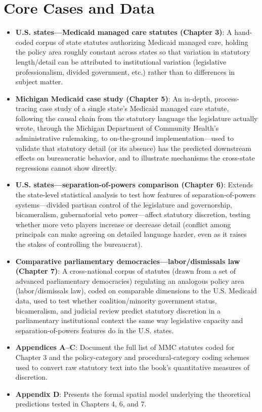 \documentclass[12pt]{article}
\begin{document}
\section{Core Cases and Data}

\begin{itemize}[leftmargin=*, itemsep=4pt]
    \item \textbf{U.S. states---Medicaid managed care statutes (Chapter 3)}: A hand-coded corpus of state statutes authorizing Medicaid managed care, holding the policy area roughly constant across states so that variation in statutory length/detail can be attributed to institutional variation (legislative professionalism, divided government, etc.) rather than to differences in subject matter.
    \item \textbf{Michigan Medicaid case study (Chapter 5)}: An in-depth, process-tracing case study of a single state's Medicaid managed care statute, following the causal chain from the statutory language the legislature actually wrote, through the Michigan Department of Community Health's administrative rulemaking, to on-the-ground implementation---used to validate that statutory detail (or its absence) has the predicted downstream effects on bureaucratic behavior, and to illustrate mechanisms the cross-state regressions cannot show directly.
    \item \textbf{U.S. states---separation-of-powers comparison (Chapter 6)}: Extends the state-level statistical analysis to test how features of separation-of-powers systems---divided partisan control of the legislature and governorship, bicameralism, gubernatorial veto power---affect statutory discretion, testing whether more veto players increase or decrease detail (conflict among principals can make agreeing on detailed language harder, even as it raises the stakes of controlling the bureaucrat).
    \item \textbf{Comparative parliamentary democracies---labor/dismissals law (Chapter 7)}: A cross-national corpus of statutes (drawn from a set of advanced parliamentary democracies) regulating an analogous policy area (labor/dismissals law), coded on comparable dimensions to the U.S. Medicaid data, used to test whether coalition/minority government status, bicameralism, and judicial review predict statutory discretion in a parliamentary institutional context the same way legislative capacity and separation-of-powers features do in the U.S. states.
    \item \textbf{Appendices A--C}: Document the full list of MMC statutes coded for Chapter 3 and the policy-category and procedural-category coding schemes used to convert raw statutory text into the book's quantitative measures of discretion.
    \item \textbf{Appendix D}: Presents the formal spatial model underlying the theoretical predictions tested in Chapters 4, 6, and 7.
\end{itemize}
\end{document}
